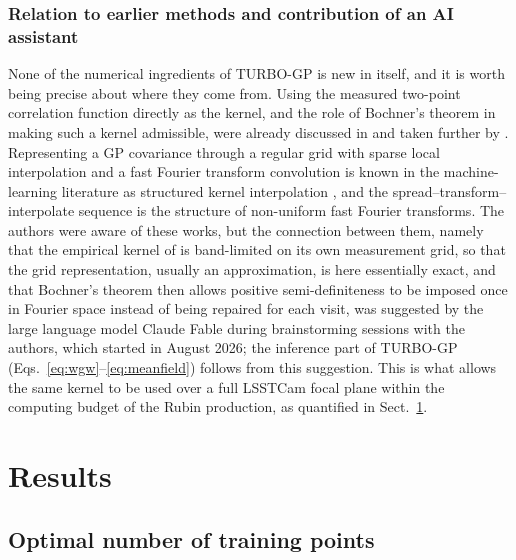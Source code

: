 \subsubsection{Relation to earlier methods and contribution of an AI assistant}
\label{sec:turbogp_origin}

None of the numerical ingredients of TURBO-GP is new in itself, and it is worth being precise about where they come from.
Using the measured two-point correlation function directly as the kernel, and the role of Bochner's theorem in making such a kernel admissible, 
were already discussed in  and taken further by .
Representing a GP covariance through a regular grid with sparse local interpolation and a fast Fourier transform convolution is known in 
the machine-learning literature as structured kernel interpolation \citep[KISS-GP;][]{wilson2015kissgp}, and the spread--transform--interpolate 
sequence is the structure of non-uniform fast Fourier transforms.
The authors were aware of these works, but the connection between them, namely that the empirical kernel of  is 
band-limited on its own measurement grid, so that the grid representation, usually an approximation, is here essentially exact, and that 
Bochner's theorem then allows positive semi-definiteness to be imposed once in Fourier space instead of being repaired for each visit, 
was suggested by the large language model Claude Fable \citep[versions 5.0 and 5.1;][]{anthropic2026fable} during brainstorming sessions 
with the authors, which started in August 2026; the inference part of TURBO-GP (Eqs.~\ref{eq:wgw}--\ref{eq:meanfield}) follows from this suggestion.
This is what allows the same kernel to be used over a full LSSTCam focal plane within the computing budget of the Rubin production, as 
quantified in Sect.~\ref{Results}.


\section{Results}
\label{Results}

\subsection{Optimal number of training points}
\label{sec:TrainingValidation}

